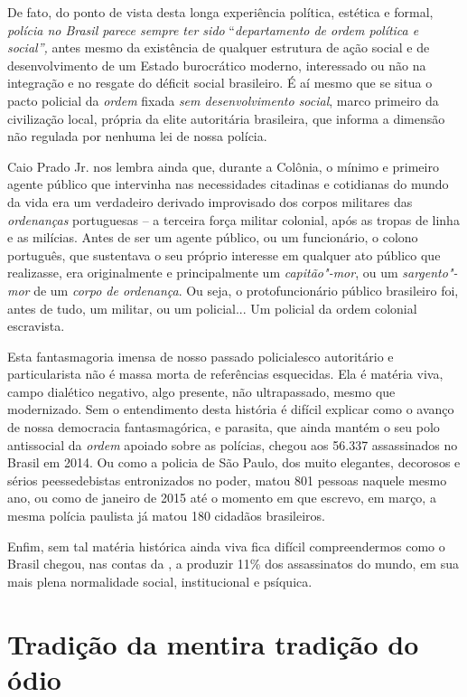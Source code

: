 De fato, do ponto de vista desta longa experiência política, estética e
formal, \emph{polícia no Brasil parece sempre ter sido}
``\emph{departamento de ordem política e social'',} antes mesmo da
existência de qualquer estrutura de ação social e de desenvolvimento de
um Estado burocrático moderno, interessado ou não na integração e no
resgate do déficit social brasileiro. É aí mesmo que se situa o pacto
policial da \emph{ordem} fixada \emph{sem desenvolvimento social}, marco
primeiro da civilização local, própria da elite autoritária brasileira,
que informa a dimensão não regulada por nenhuma lei de nossa polícia.

Caio Prado Jr. nos lembra ainda que, durante a Colônia, o mínimo e
primeiro agente público que intervinha nas necessidades citadinas e
cotidianas do mundo da vida era um verdadeiro derivado improvisado dos
corpos militares das \emph{ordenanças} portuguesas -- a terceira força
militar colonial, após as tropas de linha e as milícias. Antes de ser um
agente público, ou um funcionário, o colono português, que sustentava o
seu próprio interesse em qualquer ato público que realizasse, era
originalmente e principalmente um \emph{capitão"-mor}, ou um
\emph{sargento"-mor} de um \emph{corpo de ordenança}. Ou seja, o
protofuncionário público brasileiro foi, antes de tudo, um militar, ou
um policial... Um policial da ordem colonial escravista.

Esta fantasmagoria imensa de nosso passado policialesco autoritário e
particularista não é massa morta de referências esquecidas. Ela é
matéria viva, campo dialético negativo, algo presente, não ultrapassado,
mesmo que modernizado. Sem o entendimento desta história é difícil
explicar como o avanço de nossa democracia fantasmagórica, e parasita,
que ainda mantém o seu polo antissocial da \emph{ordem} apoiado sobre as
polícias, chegou aos 56.337 assassinados no Brasil em 2014. Ou como a
policia de São Paulo, dos muito elegantes, decorosos e sérios
peessedebistas entronizados no poder, matou 801 pessoas naquele mesmo
ano, ou como de janeiro de 2015 até o momento em que escrevo, em março,
a mesma polícia paulista já matou 180 cidadãos brasileiros.

Enfim, sem tal matéria histórica ainda viva fica difícil compreendermos
como o Brasil chegou, nas contas da , a produzir 11\% dos
assassinatos do mundo, em sua mais plena normalidade social,
institucional e psíquica.

\chapter{Tradição da mentira tradição do ódio}

